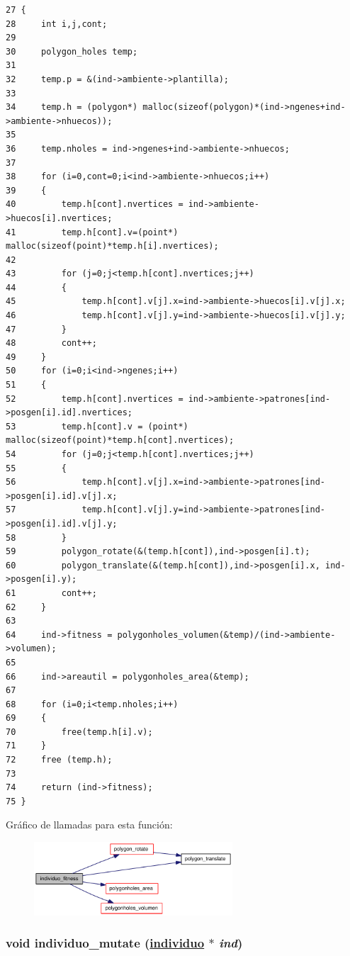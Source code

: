 \begin{Code}\begin{verbatim}27 {
28     int i,j,cont;
29 
30     polygon_holes temp;
31 
32     temp.p = &(ind->ambiente->plantilla);
33 
34     temp.h = (polygon*) malloc(sizeof(polygon)*(ind->ngenes+ind->ambiente->nhuecos));
35 
36     temp.nholes = ind->ngenes+ind->ambiente->nhuecos;
37 
38     for (i=0,cont=0;i<ind->ambiente->nhuecos;i++)
39     {
40         temp.h[cont].nvertices = ind->ambiente->huecos[i].nvertices;
41         temp.h[cont].v=(point*) malloc(sizeof(point)*temp.h[i].nvertices);
42 
43         for (j=0;j<temp.h[cont].nvertices;j++)
44         {
45             temp.h[cont].v[j].x=ind->ambiente->huecos[i].v[j].x;
46             temp.h[cont].v[j].y=ind->ambiente->huecos[i].v[j].y;
47         }
48         cont++;
49     }
50     for (i=0;i<ind->ngenes;i++)
51     {
52         temp.h[cont].nvertices = ind->ambiente->patrones[ind->posgen[i].id].nvertices;
53         temp.h[cont].v = (point*) malloc(sizeof(point)*temp.h[cont].nvertices);
54         for (j=0;j<temp.h[cont].nvertices;j++)
55         {
56             temp.h[cont].v[j].x=ind->ambiente->patrones[ind->posgen[i].id].v[j].x;
57             temp.h[cont].v[j].y=ind->ambiente->patrones[ind->posgen[i].id].v[j].y;
58         }
59         polygon_rotate(&(temp.h[cont]),ind->posgen[i].t);
60         polygon_translate(&(temp.h[cont]),ind->posgen[i].x, ind->posgen[i].y);
61         cont++;
62     }
63 
64     ind->fitness = polygonholes_volumen(&temp)/(ind->ambiente->volumen);
65 
66     ind->areautil = polygonholes_area(&temp);
67 
68     for (i=0;i<temp.nholes;i++)
69     {
70         free(temp.h[i].v);
71     }
72     free (temp.h);
73 
74     return (ind->fitness);
75 }
\end{verbatim}\end{Code}




Gr\'{a}fico de llamadas para esta funci\'{o}n:\begin{figure}[H]
\begin{center}
\leavevmode
\includegraphics[width=210pt]{group__genetic_gf152bd4602acec2166cc4b91e8c8919a_gf152bd4602acec2166cc4b91e8c8919a_cgraph}
\end{center}
\end{figure}
\hypertarget{group__genetic_g05b6d3d7a4be17c9cbf479f424edd01b_g05b6d3d7a4be17c9cbf479f424edd01b}{
\subsubsection[individuo\_\-mutate]{\setlength{\rightskip}{0pt plus 5cm}void individuo\_\-mutate (\hyperlink{struct__individuo}{individuo} $\ast$ {\em ind})}}
\label{group__genetic_g05b6d3d7a4be17c9cbf479f424edd01b_g05b6d3d7a4be17c9cbf479f424edd01b}


